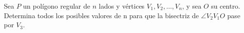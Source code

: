 Sea $P$ un polígono regular de $n$ lados y vértices $V_1, V_2, \dots , V_n$, y sea $O$ su centro. Determina todos los posibles valores de n para que la bisectriz de $\angle V_2V_1O$ pase por $V_3$.